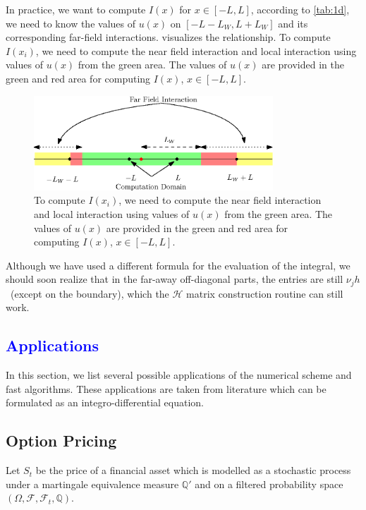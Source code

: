 \documentclass[10pt,a4paper]{article}
\newcommand{\lib}[1]{\textcolor{blue}{\section{#1}}}
\theoremstyle{definition}
\begin{document}
In practice, we want to compute $I(x)$ for $x\in [-L,L]$, according to \cref{tab:1d}, we need to know the values of $u(x)$ on $[-L-L_W,L+L_W]$ and its corresponding far-field interactions.  visualizes the relationship. To compute $I(x_i)$, we need to compute the near field interaction and local interaction using values of $u(x)$ from the green area. The values of $u(x)$ are provided in the green and red area for computing $I(x)$, $x\in [-L, L]$.

\begin{figure}[H] %
\centering
\includegraphics[width=0.8\textwidth,keepaspectratio]{figures/fig31}
\caption{To compute $I(x_i)$, we need to compute the near field interaction and local interaction using values of $u(x)$ from the green area. The values of $u(x)$ are provided in the green and red area for computing $I(x)$, $x\in [-L, L]$.}
\label{fig:fig31}
\end{figure}


Although we have used a different formula for the evaluation of the integral, we should soon realize that in the far-away off-diagonal parts, the entries are still $\nu_j h$~(except on the boundary), which the $\mathcal{H}$ matrix construction routine can still work. 

\lib{Applications}

In this section, we list several possible applications of the numerical scheme and fast algorithms. These applications are taken from literature which can be formulated as an integro-differential equation.

\subsection{Option Pricing}

Let $S_t$ be the price of a financial asset which is modelled as a stochastic process under a martingale equivalence measure $\mathbb{Q}'$ and on a filtered probability space $(\Omega, \mathcal{F}, \mathcal{F}_t, \mathbb{Q})$.
\end{document}
